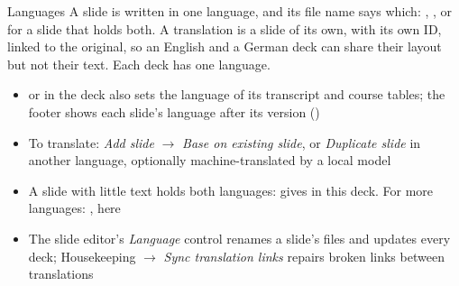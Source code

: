 
\begin{standardframe}{Languages}
	\small
	A slide is written in one language, and its file name says which:
	, , or  for a slide that holds both. A
	translation is a slide of its own, with its own ID, linked to the original,
	so an English and a German deck can share their layout but not their text.
	Each deck has one language.
	\par\medskip
	\begin{itemize}
		\item {}\SMCode{[en]} or \SMCode{[de]} in the deck also sets the language of its transcript and course tables; the footer shows each slide's language after its version ()
		\item To translate: \emph{Add slide} $\rightarrow$ \emph{Base on existing slide}, or \emph{Duplicate slide} in another language, optionally machine-translated by a local model
		\item A slide with little text holds both languages:  gives \emph{} in this deck. For more languages: , here \emph{}
		\item The slide editor's \emph{Language} control renames a slide's files and updates every deck; Housekeeping $\rightarrow$ \emph{Sync translation links} repairs broken links between translations
	\end{itemize}
\end{standardframe}
